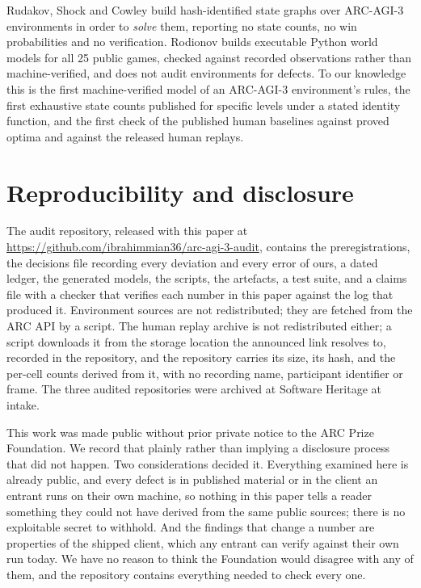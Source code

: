 \documentclass[11pt]{article}
\begin{document}
Rudakov, Shock and Cowley \cite{graphexplore} build hash-identified state graphs
over ARC-AGI-3 environments in order to \emph{solve} them, reporting no state
counts, no win probabilities and no verification. Rodionov \cite{worldmodels}
builds executable Python world models for all 25 public games, checked against
recorded observations rather than machine-verified, and does not audit
environments for defects. To our knowledge this is the first machine-verified
model of an ARC-AGI-3 environment's rules, the first exhaustive state counts
published for specific levels under a stated identity function, and the first check of the published human
baselines against proved optima and against the released human replays.

\section{Reproducibility and disclosure}
\label{sec:repro}

The audit repository, released with this paper at
\url{https://github.com/ibrahimmian36/arc-agi-3-audit},
contains the preregistrations, the decisions file recording
every deviation and every error of ours, a dated ledger, the generated models,
the scripts, the artefacts, a test suite, and a claims file with a checker that
verifies each number in this paper against the log that produced it. Environment
sources are not redistributed; they are fetched from the ARC API by a script.
The human replay archive is not redistributed either; a script downloads it
from the storage location the announced link resolves to, recorded in the
repository, and the repository carries its size, its hash,
and the per-cell counts derived from it, with no recording name, participant
identifier or frame. The three audited repositories were archived at Software
Heritage at intake.

This work was made public without prior private notice to the ARC Prize
Foundation. We record that plainly rather than implying a disclosure process
that did not happen. Two considerations decided it. Everything examined here is
already public, and every defect is in published material or in the client an
entrant runs on their own machine, so nothing in this paper tells a reader
something they could not have derived from the same public sources; there is no
exploitable secret to withhold. And the findings that change a number are
properties of the shipped client, which any entrant can verify against their own
run today. We have no reason to think the Foundation would disagree with any of
them, and the repository contains everything needed to check every one.
\end{document}
